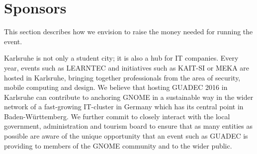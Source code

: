 \newpage


\vspace*{8.8cm}

\section{Sponsors}

This section describes how we envision to raise the money needed for running the event.

Karlsruhe is not only a student city; it is also a hub for IT companies. Every year, events such as LEARNTEC and initiatives such as KAIT-SI or MEKA are hosted in Karlsruhe, bringing together professionals from the area of security, mobile computing and design.
We believe that hosting GUADEC 2016 in Karlsruhe can contribute to anchoring GNOME in a sustainable way in the wider network of a fast-growing IT-cluster in Germany which has its central point in Baden-Württemberg.
We further commit to closely interact with the local government, administration and tourism board to ensure that as many entities as possible are aware of the unique opportunity that an event such as GUADEC is providing to members of the GNOME community and to the wider public.


